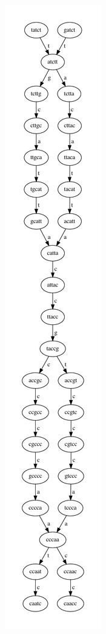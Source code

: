 \documentclass[a4paper,12pt, oneside]{book}
\begin{document}
\begin{figure}[H]
  \includegraphics[scale = 0.33]{img/mutns.pdf}
\end{figure}
\end{document}
